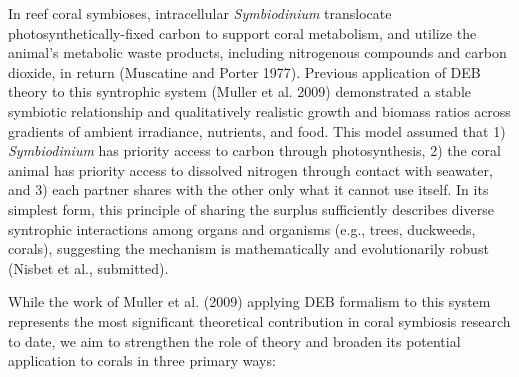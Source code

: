 \documentclass[]{elsarticle} %
\begin{document}
In reef coral symbioses, intracellular \emph{Symbiodinium} translocate
photosynthetically-fixed carbon to support coral metabolism, and utilize
the animal's metabolic waste products, including nitrogenous compounds
and carbon dioxide, in return (Muscatine and Porter 1977). Previous
application of DEB theory to this syntrophic system (Muller et al. 2009)
demonstrated a stable symbiotic relationship and qualitatively realistic
growth and biomass ratios across gradients of ambient irradiance,
nutrients, and food. This model assumed that 1) \emph{Symbiodinium} has
priority access to carbon through photosynthesis, 2) the coral animal
has priority access to dissolved nitrogen through contact with seawater,
and 3) each partner shares with the other only what it cannot use
itself. In its simplest form, this principle of sharing the surplus
sufficiently describes diverse syntrophic interactions among organs and
organisms (e.g., trees, duckweeds, corals), suggesting the mechanism is
mathematically and evolutionarily robust (Nisbet et al., submitted).

While the work of Muller et al. (2009) applying DEB formalism to this
system represents the most significant theoretical contribution in coral
symbiosis research to date, we aim to strengthen the role of theory and
broaden its potential application to corals in three primary ways:
\end{document}
